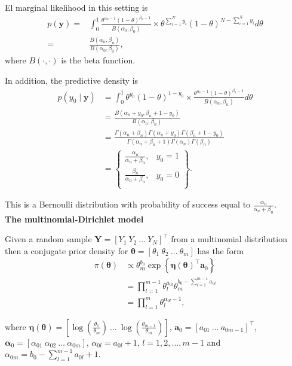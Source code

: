 \begin{enumerate}
El marginal likelihood in this setting is
\begin{align}
	p(\bm{y})=&\int_{0}^1 \frac{\theta^{\alpha_0-1}(1-\theta)^{\beta_0-1}}{B(\alpha_0,\beta_0)}\times \theta^{\sum_{i=1}^N y_i}(1-\theta)^{N-\sum_{i=1}^N y_i}d\theta\nonumber\\
	=& \frac{B(\alpha_n,\beta_n)}{B(\alpha_0,\beta_0)},\nonumber
\end{align}
where $B(\cdot ,\cdot)$ is the beta function.

In addition, the predictive density is
\begin{align}
	p(y_0\mid \bm{y})&=\int_0^1 \theta^{y_0}(1-\theta)^{1-y_0}\times \frac{\theta^{\alpha_n-1}(1-\theta)^{\beta_n-1}}{B(\alpha_n,\beta_n)}d\theta\nonumber\\
	&=\frac{B(\alpha_n+y_0,\beta_n+1-y_0)}{B(\alpha_n,\beta_n)}\nonumber\\
	&=\frac{\Gamma(\alpha_n+\beta_n)\Gamma(\alpha_n+y_0)\Gamma(\beta_n+1-y_0)}{\Gamma(\alpha_n+\beta_n+1)\Gamma(\alpha_n)\Gamma(\beta_n)}\nonumber\\
	&=\begin{Bmatrix}
		\frac{\alpha_n}{\alpha_n+\beta_n}, & y_0=1\\
		\frac{\beta_n}{\alpha_n+\beta_n}, & y_0=0\\
	\end{Bmatrix}.\nonumber
\end{align}

This is a Bernoulli distribution with probability of success equal to $\frac{\alpha_n}{\alpha_n+\beta_n}$.\\ 

\textbf{The multinomial-Dirichlet model}

Given a random sample $\bm{Y}=[Y_1 \ Y_2 \ \dots \ Y_N]^{\top}$ from a multinomial distribution then a conjugate prior density for $\bm{\theta}=\left[\theta_1 \ \theta_2 \ \dots \ \theta_m\right]$ has the form 
\begin{align}
	\pi(\bm{\theta})&\propto \theta_m^{b_0} \exp\left\{\bm{\eta}(\bm{\theta})^{\top}\bm{a}_0\right\}\nonumber\\
	& = \prod_{l=1}^{m-1}\theta_l^{a_{0l}}\theta_m^{b_0-\sum_{l=1}^{m-1}a_{0l}}\nonumber\\
	& = \prod_{l=1}^{m}\theta_l^{\alpha_{0l}-1},\nonumber
\end{align}

where $\bm{\eta}(\bm{\theta})=\left[\log\left(\frac{\theta_1}{\theta_m}\right) \ \dots \ \log\left(\frac{\theta_{m-1}}{\theta_m}\right)\right]$, $\bm{a}_0=\left[a_{01} \ \dots \ a_{0m-1}\right]^{\top}$, $\bm{\alpha}_0=\left[\alpha_{01} \ \alpha_{02} \ \dots \ \alpha_{0m}\right]$, $\alpha_{0l}=a_{0l}+1$, $l=1,2,\dots,m-1$ and $\alpha_{0m}=b_0-\sum_{l=1}^{m-1} a_{0l}+1$. 


\end{enumerate}
